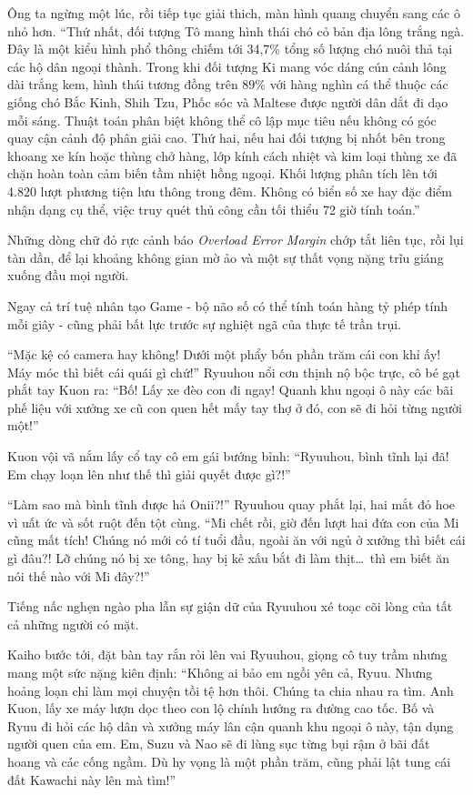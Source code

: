 \documentclass[../main.tex]{subfiles}
\begin{document}
Ông ta ngừng một lúc, rồi tiếp tục giải thich, màn hình quang chuyển sang các ô nhỏ hơn. ``Thứ nhất, đối tượng Tô mang hình thái chó cỏ bản địa lông trắng ngà. Đây là một kiểu hình phổ thông chiếm tới 34,7\% tổng số lượng chó nuôi thả tại các hộ dân ngoại thành. Trong khi đối tượng Ki mang vóc dáng cún cảnh lông dài trắng kem, hình thái tương đồng trên 89\% với hàng nghìn cá thể thuộc các giống chó Bắc Kinh, Shih Tzu, Phốc sóc và Maltese được người dân dắt đi dạo mỗi sáng. Thuật toán phân biệt không thể cô lập mục tiêu nếu không có góc quay cận cảnh độ phân giải cao. Thứ hai, nếu hai đối tượng bị nhốt bên trong khoang xe kín hoặc thùng chở hàng, lớp kính cách nhiệt và kim loại thùng xe đã chặn hoàn toàn cảm biến tầm nhiệt hồng ngoại. Khối lượng phân tích lên tới 4.820 lượt phương tiện lưu thông trong đêm. Không có biển số xe hay đặc điểm nhận dạng cụ thể, việc truy quét thủ công cần tối thiểu 72 giờ tính toán.''

Những dòng chữ đỏ rực cảnh báo \textit{Overload Error Margin} chớp tắt liên tục, rồi lụi tàn dần, để lại khoảng không gian mờ ảo và một sự thất vọng nặng trĩu giáng xuống đầu mọi người.

Ngay cả trí tuệ nhân tạo Game - bộ não số có thể tính toán hàng tỷ phép tính mỗi giây - cũng phải bất lực  trước sự nghiệt ngã của thực tế trần trụi.

``Mặc kệ có camera hay không! Dưới một phẩy bốn phần trăm cái con khỉ ấy! Máy móc thì biết cái quái gì chứ!'' Ryuuhou nổi cơn thịnh nộ bộc trực, cô bé gạt phắt tay Kuon ra: ``Bố! Lấy xe đèo con đi ngay! Quanh khu ngoại ô này các bãi phế liệu với xưởng xe cũ con quen hết mấy tay thợ ở đó, con sẽ đi hỏi từng người một!''

Kuon vội vã nắm lấy cổ tay cô em gái bướng bỉnh: ``Ryuuhou, bình tĩnh lại đã! Em chạy loạn lên như thế thì giải quyết được gì?!''

``Làm sao mà bình tĩnh được hả Onii?!'' Ryuuhou quay phắt lại, hai mắt đỏ hoe vì uất ức và sốt ruột đến tột cùng. ``Mi chết rồi, giờ đến lượt hai đứa con của Mi cũng mất tích! Chúng nó mới có tí tuổi đầu, ngoài ăn với ngủ ở xưởng thì biết cái gì đâu?! Lỡ chúng nó bị xe tông, hay bị kẻ xấu bắt đi làm thịt\dots\ thì em biết ăn nói thế nào với Mi đây?!''

Tiếng nấc nghẹn ngào pha lẫn sự giận dữ của Ryuuhou xé toạc cõi lòng của tất cả những người có mặt.

Kaiho bước tới, đặt bàn tay rắn rỏi lên vai Ryuuhou, giọng cô tuy trầm nhưng mang một sức nặng kiên định: ``Không ai bảo em ngồi yên cả, Ryuu. Nhưng hoảng loạn chỉ làm mọi chuyện tồi tệ hơn thôi. Chúng ta chia nhau ra tìm. Anh Kuon, lấy xe máy lượn dọc theo con lộ chính hướng ra đường cao tốc. Bố và Ryuu đi hỏi các hộ dân và xưởng máy lân cận quanh khu ngoại ô này, tận dụng người quen của em. Em, Suzu và Nao sẽ đi lùng sục từng bụi rậm ở bãi đất hoang và các cống ngầm. Dù hy vọng là một phần trăm, cũng phải lật tung cái đất Kawachi này lên mà tìm!''
\end{document}
